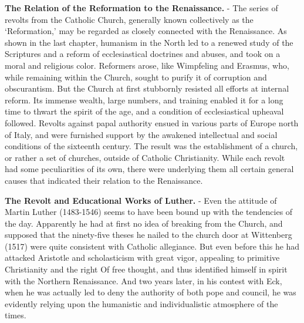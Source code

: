 \documentclass[
]{book}
\begin{document}
\textbf{The Relation of the Reformation to the Renaissance.} - The series of revolts from the Catholic Church, generally known collectively as the `Reformation,' may be regarded as closely connected with the Renaissance. As shown in the last chapter, humanism in the North led to a renewed study of the Scriptures and a reform of ecclesiastical doctrines and abuses, and took on a moral and religious color. Reformers arose, like Wimpfeling and Erasmus, who, while remaining within the Church, sought to purify it of corruption and obscurantism. But the Church at first stubbornly resisted all efforts at internal reform. Its immense wealth, large numbers, and training enabled it for a long time to thwart the spirit of the age, and a condition of ecclesiastical upheaval followed. Revolts against papal authority ensued in various parts of Europe north of Italy, and were furnished support by the awakened intellectual and social conditions of the sixteenth century. The result was the establishment of a church, or rather a set of churches, outside of Catholic Christianity. While each revolt had some peculiarities of its own, there were underlying them all certain general causes that indicated their relation to the Renaissance.

\textbf{The Revolt and Educational Works of Luther.} - Even the attitude of Martin Luther (1483-1546) seems to have been bound up with the tendencies of the day. Apparently he had at first no idea of breaking from the Church, and supposed that the ninety-five theses he nailed to the church door at Wittenberg (1517) were quite consistent with Catholic allegiance. But even before this he had attacked Aristotle and scholasticism with great vigor, appealing to primitive Christianity and the right Of free thought, and thus identified himself in spirit with the Northern Renaissance. And two years later, in his contest with Eck, when he was actually led to deny the authority of both pope and council, he was evidently relying upon the humanistic and individualistic atmosphere of the times.
\end{document}
